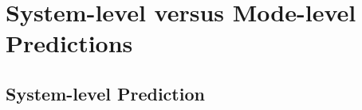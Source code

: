 \section{\label{S-SystemMode}
System-level versus Mode-level Predictions}

\subsection{\label{S-ktopdown} 
System-level Prediction}

% 
